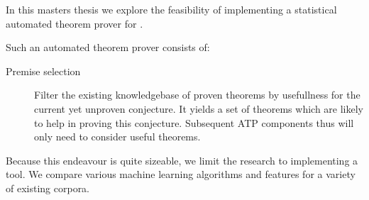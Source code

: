In this masters thesis we explore the feasibility of implementing a statistical automated theorem prover for \coq.

Such an automated theorem prover consists of:
\begin{description}
\item[Premise selection] Filter the existing knowledgebase of proven theorems by usefullness for the current yet unproven conjecture.
It yields a set of theorems which are likely to help in proving this conjecture.
Subsequent ATP components thus will only need to consider useful theorems. 
\item[]
\end{description}

Because this endeavour is quite sizeable, we limit the research to implementing a \premiseselection tool.
We compare various machine learning algorithms and features for a variety of existing \coq corpora.
